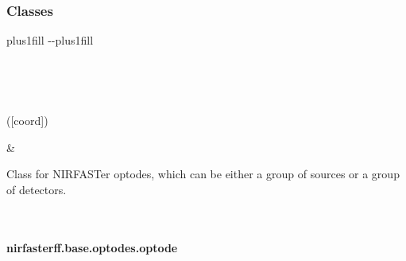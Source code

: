 \documentclass[letterpaper,10pt,english]{sphinxmanual}
\begin{document}
\subsubsection*{Classes}


\begin{savenotes}
\sphinxatlongtablestart
\sphinxthistablewithglobalstyle
\sphinxthistablewithnovlinesstyle
\makeatletter
  \LTleft \@totalleftmargin plus1fill
  \LTright\dimexpr\columnwidth-\@totalleftmargin-\linewidth\relax plus1fill
\makeatother
\begin{longtable}{}
\sphinxtoprule
\endfirsthead

\\
\sphinxtoprule
\endhead

\sphinxbottomrule
{}\\
\endfoot

\endlastfoot
\sphinxtableatstartofbodyhook
\begin{varwidth}[t]{}
\sphinxAtStartPar
{\hyperref[\detokenize{_autosummary/nirfasterff.base.optodes.optode:nirfasterff.base.optodes.optode}]{}}({[}coord{]})
\sphinxbeforeendvarwidth
\end{varwidth}%
&\begin{varwidth}[t]{}
\sphinxAtStartPar
Class for NIRFASTer optodes, which can be either a group of sources or a group of detectors.
\sphinxbeforeendvarwidth
\end{varwidth}%
\\
\sphinxbottomrule
\end{longtable}
\sphinxtableafterendhook
\sphinxatlongtableend
\end{savenotes}

\sphinxstepscope


\paragraph{nirfasterff.base.optodes.optode}
\label{\detokenize{_autosummary/nirfasterff.base.optodes.optode:nirfasterff-base-optodes-optode}}\label{\detokenize{_autosummary/nirfasterff.base.optodes.optode::doc}}
\end{document}
